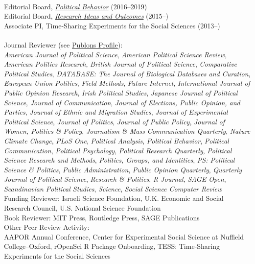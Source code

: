 \documentclass[12pt]{article}
\renewcommand{\section}[1]{\pagebreak[3]%
    \llap{\scshape\smash{\parbox[t]{\marginparwidth}{\raggedright {\color{lg}#1}}}}%
    \vspace{-\baselineskip}\par}
\newcommand{\topic}[1]{\pagebreak[3]\indent {\color{lg}{\footnotesize #1 }}\\}
\newcommand{\entry}[1]{\indent {\color{lg}\guillemotright}\hspace{2pt}#1\vspace{.25em}\\}
\begin{document}
\section{Editing \&\\ Reviewing}
\topic{Editing}
	\entry{Editorial Board, \href{http://link.springer.com/journal/11109}{\textit{Political Behavior}} (2016--2019)}
	\entry{Editorial Board, \href{http://riojournal.com/}{\textit{Research Ideas and Outcomes}} (2015--)}
	\entry{Associate PI, Time-Sharing Experiments for the Social Sciences (2013--)}

\topic{Peer Review Activity}
	\entry{Journal Reviewer (see \href{https://publons.com/a/634082/}{Publons Profile}):\\\textit{American Journal of Political Science}, \textit{American Political Science Review}, \textit{American Politics Research}, \textit{British Journal of Political Science}, \textit{Comparative Political Studies}, \textit{DATABASE: The Journal of Biological Databases and Curation}, \textit{European Union Politics}, \textit{Field Methods}, \textit{Future Internet}, \textit{International Journal of Public Opinion Research}, \textit{Irish Political Studies}, \textit{Japanese Journal of Political Science}, \textit{Journal of Communication}, \textit{Journal of Elections, Public Opinion, and Parties}, \textit{Journal of Ethnic and Migration Studies}, \textit{Journal of Experimental Political Science}, \textit{Journal of Politics}, \textit{Journal of Public Policy}, \textit{Journal of Women, Politics \& Policy}, \textit{Journalism \& Mass Communication Quarterly}, \textit{Nature Climate Change}, \textit{PLoS One}, \textit{Political Analysis}, \textit{Political Behavior}, \textit{Political Communication}, \textit{Political Psychology}, \textit{Political Research Quarterly}, \textit{Political Science Research and Methods}, \textit{Politics, Groups, and Identities}, \textit{PS: Political Science \& Politics}, \textit{Public Administration}, \textit{Public Opinion Quarterly}, \textit{Quarterly Journal of Political Science}, \textit{Research \& Politics}, \textit{R Journal}, \textit{SAGE Open}, \textit{Scandinavian Political Studies}, \textit{Science}, \textit{Social Science Computer Review}}
	\entry{Funding Reviewer: Israeli Science Foundation, U.K. Economic and Social Research Council, U.S. National Science Foundation}
	\entry{Book Reviewer: MIT Press, Routledge Press, SAGE Publications}
	\entry{Other Peer Review Activity:\\ AAPOR Annual Conference, Center for Experimental Social Science at Nuffield College--Oxford, rOpenSci R Package Onboarding, TESS: Time-Sharing Experiments for the Social Sciences}
\end{document}
